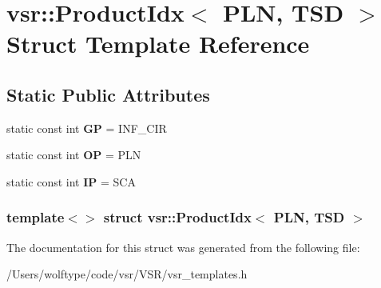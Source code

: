 \hypertarget{structvsr_1_1_product_idx_3_01_p_l_n_00_01_t_s_d_01_4}{\section{vsr\-:\-:Product\-Idx$<$ P\-L\-N, T\-S\-D $>$ Struct Template Reference}
\label{structvsr_1_1_product_idx_3_01_p_l_n_00_01_t_s_d_01_4}
}
\subsection*{Static Public Attributes}
\begin{DoxyCompactItemize}
\item 
\hypertarget{structvsr_1_1_product_idx_3_01_p_l_n_00_01_t_s_d_01_4_a12f43f6b10b42d0a18f9bda99c606af1}{static const int {\bfseries G\-P} = I\-N\-F\-\_\-\-C\-I\-R}\label{structvsr_1_1_product_idx_3_01_p_l_n_00_01_t_s_d_01_4_a12f43f6b10b42d0a18f9bda99c606af1}

\item 
\hypertarget{structvsr_1_1_product_idx_3_01_p_l_n_00_01_t_s_d_01_4_aa77dae6bbc8f261a76b042e8754c47d6}{static const int {\bfseries O\-P} = P\-L\-N}\label{structvsr_1_1_product_idx_3_01_p_l_n_00_01_t_s_d_01_4_aa77dae6bbc8f261a76b042e8754c47d6}

\item 
\hypertarget{structvsr_1_1_product_idx_3_01_p_l_n_00_01_t_s_d_01_4_a2f33f593fca0df684f3d0e07b7ed4447}{static const int {\bfseries I\-P} = S\-C\-A}\label{structvsr_1_1_product_idx_3_01_p_l_n_00_01_t_s_d_01_4_a2f33f593fca0df684f3d0e07b7ed4447}

\end{DoxyCompactItemize}
\subsubsection*{template$<$$>$ struct vsr\-::\-Product\-Idx$<$ P\-L\-N, T\-S\-D $>$}



The documentation for this struct was generated from the following file\-:\begin{DoxyCompactItemize}
\item 
/\-Users/wolftype/code/vsr/\-V\-S\-R/vsr\-\_\-templates.\-h\end{DoxyCompactItemize}
